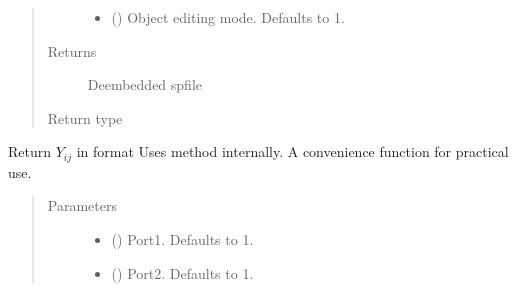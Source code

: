 \documentclass[letterpaper,10pt,english]{sphinxmanual}
\begin{document}
\begin{fulllineitems}
\begin{fulllineitems}
\begin{quote}
\begin{description}
\begin{itemize}
\item {} 
 (\sphinxstyleliteralemphasis{\sphinxupquote{, }}) \textendash{} Object editing mode. Defaults to \sphinxhyphen{}1.

\end{itemize}

\item[{Returns}] \leavevmode
De\sphinxhyphen{}embedded spfile

\item[{Return type}] \leavevmode
{\hyperref[\detokenize{touchstone:touchstone.spfile}]{}}

\end{description}\end{quote}

\end{fulllineitems}


\begin{fulllineitems}
\label{\detokenize{touchstone:touchstone.spfile.Y}}
Return \(Y_{i j}\) in format 
Uses  method internally. A convenience function for practical use.
\begin{quote}\begin{description}
\item[{Parameters}] \leavevmode\begin{itemize}
\item {} 
 (\sphinxstyleliteralemphasis{\sphinxupquote{, }}) \textendash{} Port\sphinxhyphen{}1. Defaults to 1.

\item {} 
 (\sphinxstyleliteralemphasis{\sphinxupquote{, }}) \textendash{} Port\sphinxhyphen{}2. Defaults to 1.


\end{itemize}
\end{description}
\end{quote}
\end{fulllineitems}
\end{fulllineitems}
\end{document}
